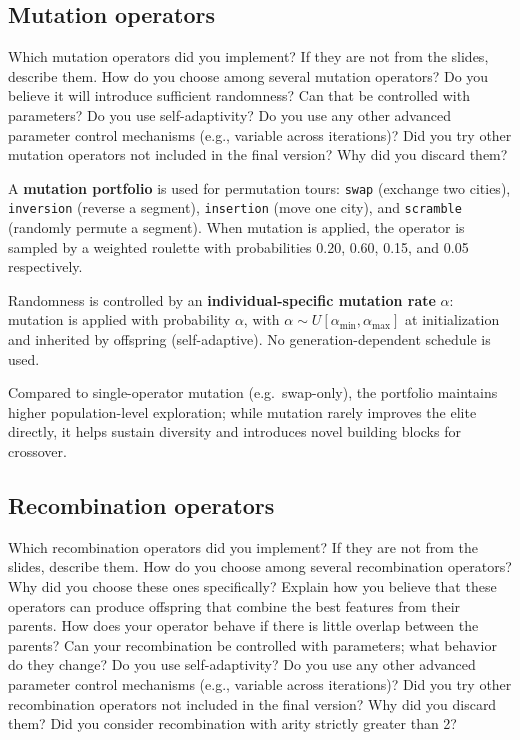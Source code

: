 \documentclass[a4paper,10pt]{article}
\newcommand{\ReplaceMe}[1]{{\color{blue}#1}}
\begin{document}
\subsection{Mutation operators}

\ReplaceMe{Which mutation operators did you implement? If they are not from the slides, describe them. How do you choose among several mutation operators? Do you believe it will introduce sufficient randomness? Can that be controlled with parameters? Do you use self-adaptivity? Do you use any other advanced parameter control mechanisms (e.g., variable across iterations)? Did you try other mutation operators not included in the final version? Why did you discard them?}

A \textbf{mutation portfolio} is used for permutation tours: \texttt{swap} (exchange two cities), \texttt{inversion}
(reverse a segment), \texttt{insertion} (move one city), and \texttt{scramble} (randomly permute a segment). When
mutation is applied, the operator is sampled by a weighted roulette with probabilities 0.20, 0.60, 0.15, and
0.05 respectively.

Randomness is controlled by an \textbf{individual-specific mutation rate} $\alpha$: mutation is applied with probability $\alpha$, with $\alpha \sim U[\alpha_{\min},\alpha_{\max}]$ at initialization and inherited by offspring (self-adaptive). No generation-dependent schedule is used.

Compared to single-operator mutation (e.g.\ swap-only), the portfolio maintains higher population-level exploration; while mutation rarely improves the elite directly, it helps sustain diversity and introduces novel building blocks for crossover.


\subsection{Recombination operators}

\ReplaceMe{Which recombination operators did you implement? If they are not from the slides, describe them. How do you choose among several recombination operators? Why did you choose these ones specifically? Explain how you believe that these operators can produce offspring that combine the best features from their parents. How does your operator behave if there is little overlap between the parents? Can your recombination be controlled with parameters; what behavior do they change? Do you use self-adaptivity? Do you use any other advanced parameter control mechanisms (e.g., variable across iterations)? Did you try other recombination operators not included in the final version? Why did you discard them? Did you consider recombination with arity strictly greater than 2?}
\end{document}
